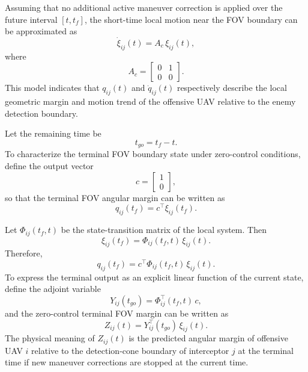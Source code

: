 \documentclass{cja}
\begin{document}
Assuming that no additional active maneuver correction is applied over the future interval $[t,t_f]$, the short-time local motion near the FOV boundary can be approximated as
\begin{equation}
\dot \xi_{ij}(t)
=
A_{c}\,\xi_{ij}(t),
\end{equation}
where
\begin{equation}
A_{c}
=
\begin{bmatrix}
0 & 1\\
0 & 0
\end{bmatrix}.
\end{equation}
This model indicates that $q_{ij}(t)$ and $\dot q_{ij}(t)$ respectively describe the local geometric margin and motion trend of the offensive UAV relative to the enemy detection boundary.

Let the remaining time be
\begin{equation}
t_{go}=t_f-t.
\end{equation}
To characterize the terminal FOV boundary state under zero-control conditions, define the output vector
\begin{equation}
c=
\begin{bmatrix}
1\\
0
\end{bmatrix},
\end{equation}
so that the terminal FOV angular margin can be written as
\begin{equation}
q_{ij}(t_f)=c^{\top}\xi_{ij}(t_f).
\end{equation}

Let $\Phi_{ij}(t_f,t)$ be the state-transition matrix of the local system. Then
\begin{equation}
\xi_{ij}(t_f)=\Phi_{ij}(t_f,t)\,\xi_{ij}(t).
\end{equation}
Therefore,
\begin{equation}
q_{ij}(t_f)=c^{\top}\Phi_{ij}(t_f,t)\,\xi_{ij}(t).
\end{equation}
To express the terminal output as an explicit linear function of the current state, define the adjoint variable
\begin{equation}
Y_{ij}(t_{go})=\Phi_{ij}^{\top}(t_f,t)\,c,
\end{equation}
and the zero-control terminal FOV margin can be written as
\begin{equation}
Z_{ij}(t)=Y_{ij}^{\top}(t_{go})\,\xi_{ij}(t).
\end{equation}
The physical meaning of $Z_{ij}(t)$ is the predicted angular margin of offensive UAV $i$ relative to the detection-cone boundary of interceptor $j$ at the terminal time if new maneuver corrections are stopped at the current time.
\end{document}
